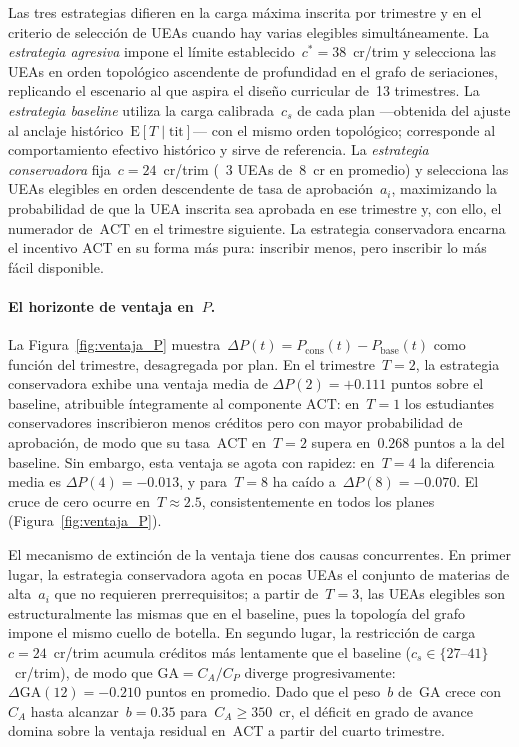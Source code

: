 \documentclass[11pt,letterpaper]{article}
\begin{document}
Las tres estrategias difieren en la carga máxima inscrita por trimestre y en el
criterio de selección de UEAs cuando hay varias elegibles simultáneamente.
La \emph{estrategia agresiva} impone el límite establecido~$c^\ast=38$~cr/trim
y selecciona las UEAs en orden topológico ascendente de profundidad en el grafo
de seriaciones, replicando el escenario al que aspira el diseño curricular de~13
trimestres.
La \emph{estrategia baseline} utiliza la carga calibrada~$c_s$ de cada plan
---obtenida del ajuste al anclaje histórico~$\mathrm{E}[T\mid\text{tit}]$--- con
el mismo orden topológico; corresponde al comportamiento efectivo histórico y
sirve de referencia.
La \emph{estrategia conservadora} fija~$c=24$~cr/trim (~$3$ UEAs de~$8$~cr
en promedio) y selecciona las UEAs elegibles en orden descendente de tasa de
aprobación~$a_i$, maximizando la probabilidad de que la UEA inscrita sea aprobada
en ese trimestre y, con ello, el numerador de~$\mathrm{ACT}$ en el trimestre
siguiente.
La estrategia conservadora encarna el incentivo ACT en su forma más pura:
inscribir menos, pero inscribir lo más fácil disponible.

\paragraph{El horizonte de ventaja en~$P$.}
\label{sec:horizonte_ventaja}

La Figura~\ref{fig:ventaja_P} muestra~$\Delta P(t) = P_\mathrm{cons}(t) - P_\mathrm{base}(t)$
como función del trimestre, desagregada por plan.
En el trimestre~$T=2$, la estrategia conservadora exhibe una ventaja media de
$\Delta P(2)=+0.111$ puntos sobre el baseline, atribuible íntegramente al componente
$\mathrm{ACT}$: en~$T=1$ los estudiantes conservadores inscribieron menos créditos
pero con mayor probabilidad de aprobación, de modo que su tasa~$\mathrm{ACT}$
en~$T=2$ supera en~$0.268$ puntos a la del baseline.
Sin embargo, esta ventaja se agota con rapidez: en~$T=4$ la diferencia media es
$\Delta P(4)=-0.013$, y para~$T=8$ ha caído a~$\Delta P(8)=-0.070$.
El cruce de cero ocurre en~$T\approx2.5$, consistentemente en todos los planes
(Figura~\ref{fig:ventaja_P}).

El mecanismo de extinción de la ventaja tiene dos causas concurrentes.
En primer lugar, la estrategia conservadora agota en pocas UEAs el conjunto de
materias de alta~$a_i$ que no requieren prerrequisitos; a partir de~$T=3$,
las UEAs elegibles son estructuralmente las mismas que en el baseline, pues la
topología del grafo impone el mismo cuello de botella.
En segundo lugar, la restricción de carga~$c=24$~cr/trim acumula créditos más
lentamente que el baseline ($c_s\in\{27\text{--}41\}$~cr/trim), de modo que
$\mathrm{GA}=C_A/C_P$ diverge progresivamente:
$\Delta\mathrm{GA}(12)=-0.210$ puntos en promedio.
Dado que el peso~$b$ de~$\mathrm{GA}$ crece con~$C_A$ hasta alcanzar~$b=0.35$
para~$C_A\geq350$~cr, el déficit en grado de avance domina
sobre la ventaja residual en~$\mathrm{ACT}$ a partir del cuarto trimestre.
\end{document}
